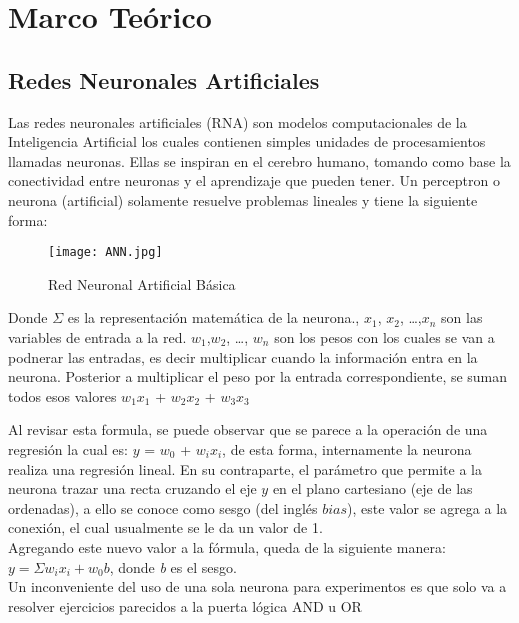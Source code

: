 \section{Marco Teórico}

    \subsection{Redes Neuronales Artificiales}
    	
    	
        Las redes neuronales artificiales (RNA) son modelos computacionales de la Inteligencia Artificial los cuales contienen simples
        unidades de procesamientos llamadas neuronas.  Ellas se inspiran en el cerebro humano, tomando como base la conectividad entre neuronas y el aprendizaje que pueden tener.  Un perceptron o neurona (artificial) solamente resuelve problemas lineales y tiene la 
        siguiente forma:
        \begin{figure}[H]
            \centering
            \texttt{[image: ANN.jpg]}
            \caption{Red Neuronal Artificial B\'asica}
            \label{fig:fig1}
        \end{figure}

       Donde $\Sigma$ es la representaci\'on matem\'atica de la neurona.,  $x_1$, $x_2$,  \dots  ,$x_n$ son las variables de entrada a la red.  $w_1$,$w_2$,  \dots , $w_n$ son los pesos con los cuales se van a podnerar las entradas, es decir multiplicar cuando la información entra en la neurona. Posterior a multiplicar el peso por la entrada correspondiente,  se suman todos esos valores $w_1$$x_1$ + $w_2$$x_2$ + $w_3$$x_3$
        
        Al revisar esta formula, se puede observar que se parece a la operaci\'on de una regresi\'on 
        la cual es:  $y$ = $w_0$ + $w_i$$x_i$,  de esta forma, internamente la neurona realiza una regresi\'on lineal. En su contraparte, el parámetro que permite a la neurona trazar una recta cruzando el eje $y$ en el plano cartesiano (eje de las ordenadas), a ello se conoce como sesgo (del inglés $bias$),  este valor se agrega a la conexi\'on, el cual usualmente se le da un valor de 1. \\
        Agregando este nuevo valor a la f\'ormula, queda de la siguiente manera: $ y = \Sigma w_i x_i + w_0 b$,  donde \textit{b} es el sesgo. \\
        
        Un inconveniente del uso de una sola neurona para experimentos es que solo 
        va a resolver ejercicios parecidos a la puerta l\'ogica AND u OR 
        
